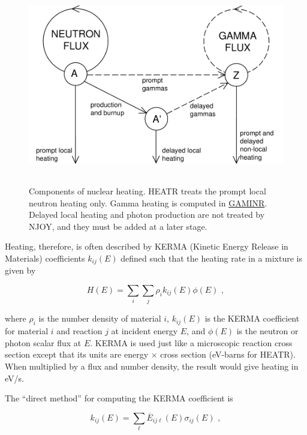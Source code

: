 \begin{figure}[thb]\centering
\includegraphics[height=3.4in, angle=0]{figs/heatr1}
\caption[Components of nuclear heating]{Components of nuclear
   heating.  HEATR treats the prompt
   local neutron heating only.  Gamma heating is computed
   in \hyperlink{sGAMINRhy}{GAMINR}.  Delayed local heating
   and photon production are
   not treated by NJOY, and they must be added at a later stage.}
\label{f1}
\end{figure}

Heating, therefore, is often described by
KERMA\cite{MACK} (Kinetic Energy Release in Materials)
coefficients $k_{ij}(E)$ defined such that the heating rate in a
mixture is given by

\begin{equation}
   H(E)=\sum_i\sum_j\rho_i k_{ij}(E)\phi(E)\,\,,
\label{HofE}
\end{equation}

\noindent
where $\rho_i$ is the number density of material $i$, $k_{ij}(E)$ is
the KERMA coefficient for material $i$ and reaction $j$ at incident
energy $E$, and $\phi(E)$ is the neutron or photon scalar flux at $E$.
KERMA is used just like a microscopic reaction cross section except
that its units are energy $\times$ cross section (eV-barns for HEATR).
When multiplied by a flux and number density, the result would give
heating in eV/s.

The ``direct method'' for computing the KERMA
coefficient is

\begin{equation}
   k_{ij}(E)=\sum_\ell \overline{E}_{ij\ell}(E)\sigma_{ij}(E)\,\,,
\label{direct}
\end{equation}

